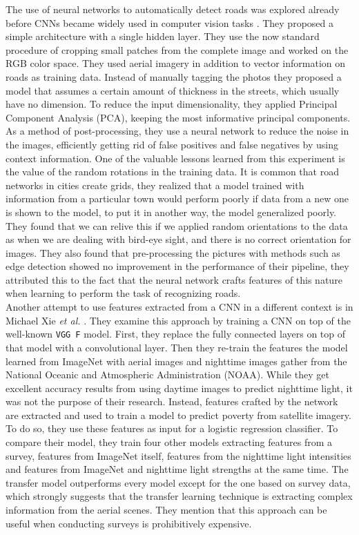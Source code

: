The use of neural networks to automatically detect roads was explored already before CNNs became widely used in computer vision tasks \cite{Mnih:2010:LDR:1888212.1888230}. They proposed a simple architecture with a single hidden layer. They use the now standard procedure of cropping small patches from the complete image and worked on the RGB color space. They used aerial imagery in addition to vector information on roads as training data. Instead of manually tagging the photos they proposed a model that assumes a certain amount of thickness in the streets, which usually have no dimension. To reduce the input dimensionality, they applied Principal Component Analysis (PCA), keeping the most informative principal components. As a method of post-processing, they use a neural network to reduce the noise in the images, efficiently getting rid of false positives and false negatives by using context information. One of the valuable lessons learned from this experiment is the value of the random rotations in the training data. It is common that road networks in cities create grids, they realized that a model trained with information from a particular town would perform poorly if data from a new one is shown to the model, to put it in another way, the model generalized poorly. They found that we can relive this if we applied random orientations to the data as when we are dealing with bird-eye sight, and there is no correct orientation for images. They also found that pre-processing the pictures with methods such as edge detection showed no improvement in the performance of their pipeline, they attributed this to the fact that the neural network crafts features of this nature when learning to perform the task of recognizing roads.\\

Another attempt to use features extracted from a CNN in a different context is in Michael Xie \textit{et al.} \cite{DBLP:journals/corr/XieJBLE15}. They examine this approach by training a CNN on top of the well-known \texttt{VGG F} model. First, they replace the fully connected layers on top of that model with a convolutional layer. Then they re-train the features the model learned from ImageNet with aerial images and nighttime images gather from the National Oceanic and Atmospheric Administration (NOAA). While they get excellent accuracy results from using daytime images to predict nighttime light, it was not the purpose of their research. Instead, features crafted by the network are extracted and used to train a model to predict poverty from satellite imagery. To do so, they use these features as input for a logistic regression classifier. To compare their model, they train four other models extracting features from a survey, features from ImageNet itself, features from the nighttime light intensities and features from ImageNet and nighttime light strengths at the same time. The transfer model outperforms every model except for the one based on survey data, which strongly suggests that the transfer learning technique is extracting complex information from the aerial scenes. They mention that this approach can be useful when conducting surveys is prohibitively expensive.\\

